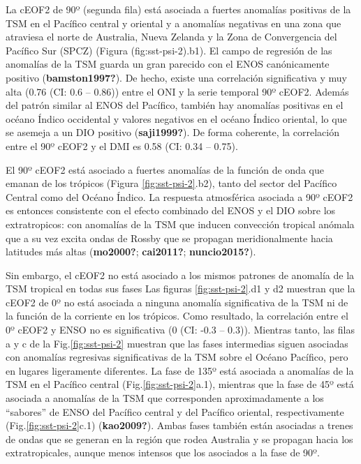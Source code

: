 \documentclass[12pt,oneside]{reedthesis}
\begin{document}
La cEOF2 de 90º (segunda fila) está asociada a fuertes anomalías positivas de la TSM en el Pacífico central y oriental y a anomalías negativas en una zona que atraviesa el norte de Australia, Nueva Zelanda y la Zona de Convergencia del Pacífico Sur (SPCZ) (Figura (fig:sst-psi-2).b1).
El campo de regresión de las anomalías de la TSM guarda un gran parecido con el ENOS canónicamente positivo (\textbf{bamston1997?}).
De hecho, existe una correlación significativa y muy alta (0.76 (CI: 0.6 -- 0.86)) entre el ONI y la serie temporal 90º cEOF2.
Además del patrón similar al ENOS del Pacífico, también hay anomalías positivas en el océano Índico occidental y valores negativos en el océano Índico oriental, lo que se asemeja a un DIO positivo (\textbf{saji1999?}).
De forma coherente, la correlación entre el 90º cEOF2 y el DMI es 0.58 (CI: 0.34 -- 0.75).

El 90º cEOF2 está asociado a fuertes anomalías de la función de onda que emanan de los trópicos (Figura \ref{fig:sst-psi-2}.b2), tanto del sector del Pacífico Central como del Océano Índico.
La respuesta atmosférica asociada a 90º cEOF2 es entonces consistente con el efecto combinado del ENOS y el DIO sobre los extratropicos: con anomalías de la TSM que inducen convección tropical anómala que a su vez excita ondas de Rossby que se propagan meridionalmente hacia latitudes más altas (\textbf{mo2000?}; \textbf{cai2011?}; \textbf{nuncio2015?}).

Sin embargo, el cEOF2 no está asociado a los mismos patrones de anomalía de la TSM tropical en todas sus fases Las figuras \ref{fig:sst-psi-2}.d1 y d2 muestran que la cEOF2 de 0º no está asociada a ninguna anomalía significativa de la TSM ni de la función de la corriente en los trópicos.
Como resultado, la correlación entre el 0º cEOF2 y ENSO no es significativa (0 (CI: -0.3 -- 0.3)).
Mientras tanto, las filas a y c de la Fig.\ref{fig:sst-psi-2} muestran que las fases intermedias siguen asociadas con anomalías regresivas significativas de la TSM sobre el Océano Pacífico, pero en lugares ligeramente diferentes.
La fase de 135º está asociada a anomalías de la TSM en el Pacífico central (Fig.\ref{fig:sst-psi-2}a.1), mientras que la fase de 45º está asociada a anomalías de la TSM que corresponden aproximadamente a los ``sabores'' de ENSO del Pacífico central y del Pacífico oriental, respectivamente (Fig.\ref{fig:sst-psi-2}c.1) (\textbf{kao2009?}).
Ambas fases también están asociadas a trenes de ondas que se generan en la región que rodea Australia y se propagan hacia los extratropicales, aunque menos intensos que los asociados a la fase de 90º.
\end{document}
